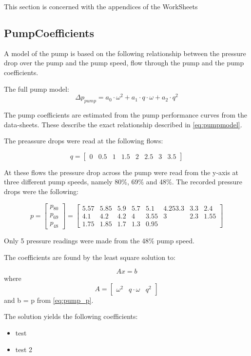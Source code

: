 This section is concerned with the appendices of the WorkSheets

\subsection{PumpCoefficients}

A model of the pump is based on the following relationship between the pressure drop over the pump and the pump speed, flow through the pump and the pump coefficients.

The full pump model:
\begin{equation} \label{eq:pumpmodel}
		\Delta p_{pump}  = a_0  \cdot \omega^2 + a_1 \cdot q \cdot \omega + a_2 \cdot q^2
\end{equation}

The pump coefficients are estimated from the pump performance curves from the data-sheets. These describe the exact relationship described in \cref{eq:pumpmodel}.

The preassure drops were read at the following flows:

\begin{equation}
	q = \begin{bmatrix}
		0 & 0.5 & 1 & 1.5 & 2 & 2.5 & 3 & 3.5 
	\end{bmatrix} 
\label{eq:pump_q}
\end{equation}

At these flows the pressure drop across the pump were read from the y-axis at three different pump speeds, namely 80\%, 69\% and 48\%. The recorded pressure drops were the following:

\begin{equation}
	p =  \begin{bmatrix}
		p_{80}\\
		p_{69} \\
		p_{48}
	\end{bmatrix}  = 
	\begin{bmatrix}
		5.57 & 5.85 & 5.9 & 5.7 & 5.1 & 4.253.3 & 3.3 & 2.4 \\
		4.1 & 4.2 & 4.2 & 4 & 3.55 & 3 & 2.3 & 1.55 \\
		1.75 & 1.85 & 1.7 & 1.3 & 0.95 &  &  &  
	\end{bmatrix} 
\label{eq:pump_p}
\end{equation}

Only 5 pressure readings were made from the 48\% pump speed.

The coefficients are found by the least square solution to:

\begin{equation}
	Ax = b
\end{equation}
where 
\begin{equation}
	A = \begin{bmatrix}
			\omega^2 & q \cdot \omega & q^2
			\end{bmatrix}
\end{equation}
and b = p from \cref{eq:pump_p}.

The solution yields the following coefficients:
\begin{itemize}
	\item test
	\item test 2
\end{itemize}









